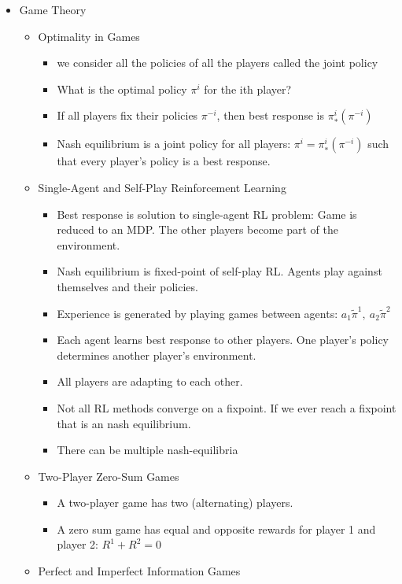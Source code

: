 \begin{itemize}[noitemsep,nolistsep]
	\item Game Theory
	\begin{itemize}[noitemsep,nolistsep]
		\item Optimality in Games
		\begin{itemize}[noitemsep,nolistsep]
			\item we consider all the policies of all the players called the joint policy
			\item What is the optimal policy $\pi^i$ for the ith player?
			\item If all players fix their policies $\pi^{-i}$, then best response is $\pi_*^i (\pi^{-i})$
			\item Nash equilibrium is a joint policy for all players: $\pi^i = \pi_*^i (\pi^{-i})$ such that every player's policy is a best response.
		\end{itemize}
		\item Single-Agent and Self-Play Reinforcement Learning
		\begin{itemize}[noitemsep,nolistsep]
			\item Best response is solution to single-agent RL problem: Game is reduced to an MDP. The other players become part of the environment.
			\item Nash equilibrium is fixed-point of self-play RL. Agents play against themselves and their policies.
			\item Experience is generated by playing games between agents: $a_1 \tilde \pi^1,\ a_2 \tilde \pi^2$
			\item Each agent learns best response to other players. One player's policy determines another player's environment.
			\item All players are adapting to each other.
			\item Not all RL methods converge on a fixpoint. If we ever reach a fixpoint that is an nash equilibrium.
			\item There can be multiple nash-equilibria
		\end{itemize}
		\item Two-Player Zero-Sum Games
		\begin{itemize}[noitemsep,nolistsep]
			\item A two-player game has two (alternating) players.
			\item A zero sum game has equal and opposite rewards for player 1 and player 2: $R^1 + R^2 = 0$
		\end{itemize}
		\item Perfect and Imperfect Information Games

\end{itemize}
\end{itemize}
